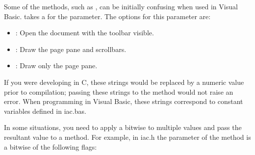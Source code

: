 \documentclass[letterpaper,12pt,english,openany,oneside]{sphinxmanual}
\begin{document}
Some of the methods, such as , can be initially confusing when used in Visual Basic.  takes a  for the  parameter. The options for this parameter are:
\begin{itemize}
\item {} 
: Open the document with the toolbar visible.

\item {} 
: Draw the page pane and scrollbars.

\item {} 
: Draw only the page pane.

\end{itemize}

If you were developing in C, these strings would be replaced by a numeric value prior to compilation; passing these strings to the method would not raise an error. When programming in Visual Basic, these strings correspond to constant variables defined in iac.bas.

In some situations, you need to apply a bitwise  to multiple values and pass the resultant value to a method. For example, in iac.h the  parameter of the  method is a bitwise  of the following flags:
\end{document}
